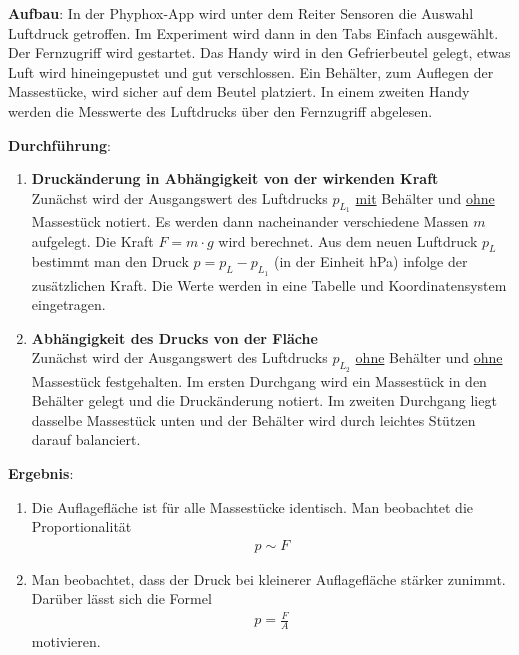 \documentclass[../main.tex]{subfiles}
\begin{document}
\begin{tcolorbox}
    \vspace{0.4cm}
    \textbf{Aufbau}: In der Phyphox-App wird unter dem Reiter \glqq Sensoren\grqq{} die Auswahl \glqq Luftdruck\grqq{} getroffen. Im Experiment wird dann in den Tabs \glqq Einfach\grqq{} ausgewählt. Der Fernzugriff wird gestartet. Das Handy wird in den Gefrierbeutel gelegt, etwas Luft wird hineingepustet und gut verschlossen. Ein Behälter, zum Auflegen der Massestücke, wird sicher auf dem Beutel platziert. In einem zweiten Handy werden die Messwerte des Luftdrucks über den Fernzugriff abgelesen.  

    \vspace{0.4cm}
    \textbf{Durchführung}: 
    \begin{enumerate}
        \item \textbf{Druckänderung in Abhängigkeit von der wirkenden Kraft} \\
            Zunächst wird der Ausgangswert des Luftdrucks $p_{L_1}$ \underline{mit} Behälter und \underline{ohne} Massestück notiert. Es werden dann nacheinander verschiedene Massen $m$ aufgelegt. Die Kraft $F = m \cdot g$ wird berechnet. Aus dem neuen Luftdruck $p_L$ bestimmt man den Druck $p = p_L - p_{L_1}$ (in der Einheit hPa) infolge der zusätzlichen Kraft. Die Werte werden in eine Tabelle und Koordinatensystem eingetragen.
        \item \textbf{Abhängigkeit des Drucks von der Fläche}\\
            Zunächst wird der Ausgangswert des Luftdrucks $p_{L_2}$ \underline{ohne} Behälter und \underline{ohne} Massestück festgehalten. Im ersten Durchgang wird ein Massestück in den Behälter gelegt und die Druckänderung notiert. Im zweiten Durchgang liegt dasselbe Massestück unten und der Behälter wird durch leichtes Stützen darauf balanciert.  

    \end{enumerate}

    \vspace{0.4cm}
    \textbf{Ergebnis}: 
    \begin{enumerate}
        \item Die Auflagefläche ist für alle Massestücke identisch. Man beobachtet die Proportionalität
            \begin{align*}
                p \sim F
            \end{align*}
        \item Man beobachtet, dass der Druck bei kleinerer Auflagefläche stärker zunimmt. Darüber lässt sich die Formel
            \begin{align*}
                p = \frac{F}{A}
            \end{align*}
            motivieren.
    \end{enumerate}

\end{tcolorbox}
\end{document}
